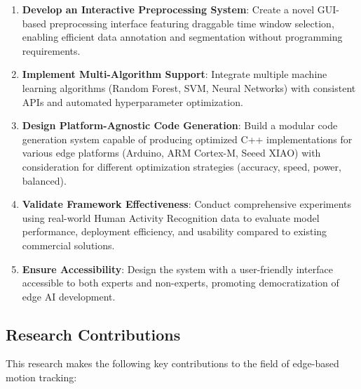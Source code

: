 \begin{enumerate}
\item \textbf{Develop an Interactive Preprocessing System}: Create a novel GUI-based preprocessing interface featuring draggable time window selection, enabling efficient data annotation and segmentation without programming requirements.

\item \textbf{Implement Multi-Algorithm Support}: Integrate multiple machine learning algorithms (Random Forest, SVM, Neural Networks) with consistent APIs and automated hyperparameter optimization.

\item \textbf{Design Platform-Agnostic Code Generation}: Build a modular code generation system capable of producing optimized C++ implementations for various edge platforms (Arduino, ARM Cortex-M, Seeed XIAO) with consideration for different optimization strategies (accuracy, speed, power, balanced).

\item \textbf{Validate Framework Effectiveness}: Conduct comprehensive experiments using real-world Human Activity Recognition data to evaluate model performance, deployment efficiency, and usability compared to existing commercial solutions.

\item \textbf{Ensure Accessibility}: Design the system with a user-friendly interface accessible to both experts and non-experts, promoting democratization of edge AI development.

\end{enumerate}

\subsection{Research Contributions}

This research makes the following key contributions to the field of edge-based motion tracking:

